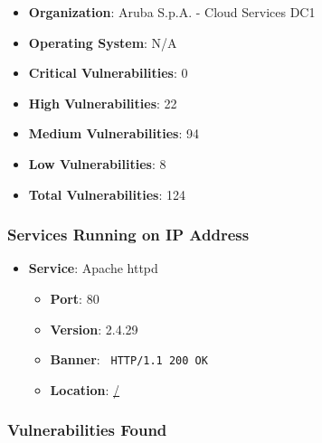 \documentclass{article}
\begin{document}
\begin{itemize}
    \item \textbf{Organization}: Aruba S.p.A. - Cloud Services DC1
    \item \textbf{Operating System}:  N/A 
    \item \textbf{Critical Vulnerabilities}: 0
    \item \textbf{High Vulnerabilities}: 22
    \item \textbf{Medium Vulnerabilities}: 94
    \item \textbf{Low Vulnerabilities}: 8
    \item \textbf{Total Vulnerabilities}: 124
\end{itemize}

\subsubsection*{Services Running on IP Address}

\begin{itemize}
    
        \item \textbf{Service}: Apache httpd
        \begin{itemize}
            \item \textbf{Port}: 80
            \item \textbf{Version}:  2.4.29 
            \item \textbf{Banner}: \texttt{ HTTP/1.1 200 OK
 }
            \item \textbf{Location}: \href{ / }{ / }
        \end{itemize}
    
\end{itemize}


\subsubsection*{Vulnerabilities Found}
\end{document}
